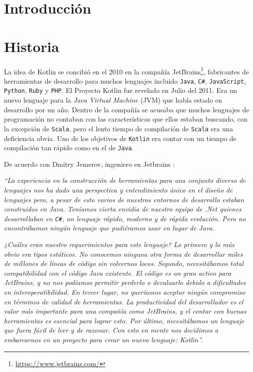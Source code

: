 \tableofcontents

\section{Introducción}

\section{Historia}
La idea de Kotlin se concibió en el 2010 en la compañía JetBrains\footnote{\url{https://www.jetbrains.com/}}, fabricantes de herramientas de desarrollo para muchos lenguajes incluido \texttt{Java}, \texttt{C\#}, \texttt{JavaScript}, \texttt{Python}, \texttt{Ruby} y \texttt{PHP}\cite{kotlin-in-action}. El Proyecto Kotlin fue revelado en Julio del 2011. Era un nuevo lenguaje para la \emph{Java Virtual Machine} (JVM) que había estado en desarrollo por un año\cite{krill}. Dentro de la compañía se acusaba que muchos lenguajes de programación no contaban con las características que ellos estaban buscando, con la excepción de \texttt{Scala}, pero el lento tiempo de compilación de \texttt{Scala} era una deficiencia obvia. Uno de los objetivos de \texttt{Kotlin} era contar con un tiempo de compilación tan rápido como en el de \texttt{Java}.

De acuerdo con Dmitry Jemerov, ingeniero en Jetbrains \cite{kotlin-in-action}: 

\emph{``La experiencia en la construcción de herramientas para una conjunto diverso de lenguajes nos ha dado una perspectiva y entendimiento único en el diseño de lenguajes pero, a pesar de esto varios de nuestros entornos de desarrollo estaban construidos en Java. Teníamos cierta envidia de nuestro equipo de .Net quienes desarrollaban en \texttt{C\#}, un lenguaje rápido, moderno y de rápida evolución. Pero no encontrábamos ningún lenguaje que pudiéramos usar en lugar de Java.}

\emph{¿Cuáles eran nuestro requerimientos para este lenguaje? Lo primero y lo más obvio era tipos estáticos. No conocemos ninguna otra forma de desarrollar miles de millones de líneas de código sin volvernos locos. Segundo, necesitábamos total compatibilidad con el código Java existente. El código es un gran activo para JetBrains, y no nos podíamos permitir perderlo o devaluarlo debido a dificultades en interoperatibilidad. En tercer lugar, no queríamos aceptar ningún compromiso en términos de calidad de herramientas. La productividad del desarrollador es el valor más importante para una compañía como JetBrains, y el contar con buenas herramientas es esencial para lograr esto. Por último, necesitábamos un lenguaje que fuera fácil de leer y de razonar. Con esto en mente nos decidimos a embarcarnos en un proyecto para crear un nuevo lenguaje: Kotlin''.}


